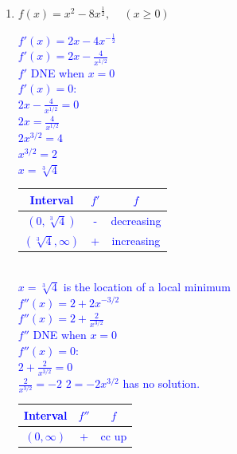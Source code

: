 \documentclass{ximera}
\begin{document}
\begin{exercise}
\begin{enumerate}
{\begin{image}
    \end{image}
     \xmalt sketch of the function $x^3-2x^2+x$.
    }
    \item $f(x)=x^2-8x^{\frac{1}{2}},\,\,\,\,\,\,\, (x\geq 0)$\\
    \textcolor{blue}{$f'(x)=2x-4x^{-\frac12}$\\
    $f'(x)=2x-\frac{4}{x^{1/2}}$\\
    $f'$ DNE when $x=0$\\
    $f'(x)=0$:\\
    $2x-\frac4{x^{1/2}}=0$\\
    $2x=\frac4{x^{1/2}}$\\
    $2x^{3/2}=4$\\
    $x^{3/2}=2$\\
    $x=\sqrt[3]{4}$\\
    \begin{tabular}{c|c|c}
       Interval  & $f'$ & $f$  \\ \hline
     $(0,\sqrt[3]{4})$ & - & decreasing \\
     $(\sqrt[3]{4},\infty)$ & + & increasing\\
    \end{tabular}\\
    $x=\sqrt[3]{4}$ is the location of a local minimum\\
    $f''(x)=2+2x^{-3/2}$\\
    $f''(x)=2+\frac{2}{x^{3/2}}$\\
    $f''$ DNE when $x=0$\\
    $f''(x)=0$:\\
    $2+\frac{2}{x^{3/2}}=0$\\
    $\frac{2}{x^{3/2}}=-2$
    $2=-2x^{3/2}$ has no solution.\\
    \begin{tabular}{c|c|c}
        Interval & $f''$ & $f$  \\ \hline
       $(0,\infty)$  & + & cc up \\
    \end{tabular}\\
}
\end{enumerate}
\end{exercise}
\end{document}
